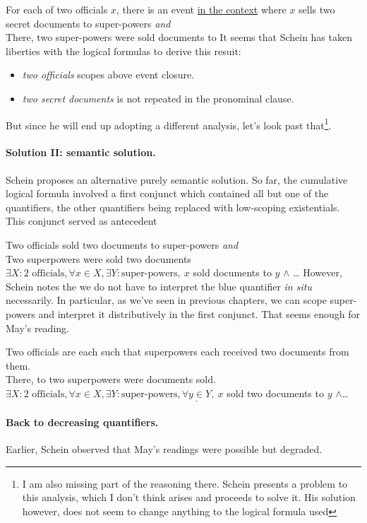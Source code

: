 \documentclass[english]{article}
\newcommand{\fg}{\color{darkred}}
\newcommand{\bg}{\color{blueish}}
\begin{document}
\ex
For each of two officials $x$, there is an event \underline{in the context} where $x$ sells two secret documents to super-powers \emph{and}\\
There, two super-powers were sold documents to
\xe
%
It seems that Schein has taken liberties with the logical formulas to derive this resuit:

\begin{itemize}
\item \emph{two officials} scopes above event closure.
\item \emph{two secret documents} is not repeated in the pronominal clause.
\end{itemize}
%
But since he will end up adopting a different analysis, let's look past that\footnote{
I am also missing part of the reasoning there. Schein presents a problem to this analysis, which I don't think arises and proceeds to solve it. His solution however, does not seem to change anything to the logical formula used
}. 

\paragraph{Solution II: semantic solution.}
Schein proposes an alternative purely semantic solution. So far, the cumulative logical formula involved a first conjunct which contained all but one of the quantifiers, the other quantifiers being replaced with low-scoping existentials. This conjunct served as antecedent

\pex
\a
{\fg Two officials} sold two documents to {\bg super-powers} \emph{and}\\
Two superpowers were sold two documents
\a
$\exists X : 2\text{ officials}, \forall x\in X, \exists Y : \text{super-powers},\ x$ sold documents to $y$ $\wedge$
\ldots
\xe
%
However, Schein notes the we do not have to interpret the {\bg blue} quantifier \emph{in situ} necessarily. In particular, as we've seen in previous chapters, we can scope {\bg super-powers} and interpret it distributively in the first conjunct. That seems enough for May's reading.

\pex
\a
Two officials are each such that superpowers each received two documents from them.\\
There, to two superpowers were documents sold.
\a
$\exists X : 2\text{ officials}, \forall x\in X, \exists Y : \text{super-powers}, \underline{\forall y\in Y},\ x$ sold two documents to $y$ $\wedge$\ldots
\xe
%

\paragraph{Back to decreasing quantifiers.}
Earlier, Schein observed that May's readings were possible but degraded.
\end{document}
